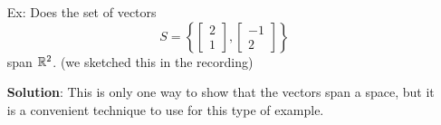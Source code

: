 \documentclass[reqno]{amsart}
\theoremstyle{definition}
\begin{document}
\begin{enumerate}
\begin{enumerate}
\end{enumerate}

\item[Ex:  ]  Does the set of vectors
%
\begin{equation*}
S = \left\lbrace\begin{bmatrix}
2\\
1
\end{bmatrix},\begin{bmatrix}
-1\\
2
\end{bmatrix}\right\rbrace
\end{equation*}
%
span $\mathbb{R}^2$.  {\color{blue}(we sketched this in the recording)}

\textbf{Solution}:  This is only one way to show that the vectors span a space, but it is
a convenient technique to use for this type of example.


\end{enumerate}
\end{document}
